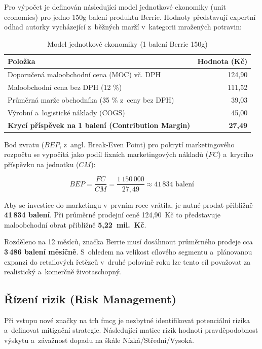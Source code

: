 Pro výpočet je definován následující model jednotkové ekonomiky (unit economics) pro jedno 150g balení produktu Berrie. Hodnoty představují expertní odhad autorky vycházející z~běžných marží v~kategorii mražených potravin:

\begin{table}[H]
\centering
\caption{Model jednotkové ekonomiky (1 balení Berrie 150g)}
\label{tab:unit_economics}
\begin{tabularx}{0.8\textwidth}{Xr}
\toprule
\textbf{Položka} & \textbf{Hodnota (Kč)} \\
\midrule
Doporučená maloobchodní cena (MOC) vč. DPH & 124,90 \\
Maloobchodní cena bez DPH (12 \%) & 111,52 \\
Průměrná marže obchodníka (35 \% z~ceny bez DPH) & 39,03 \\
Výrobní a~logistické náklady (COGS) & 45,00 \\
\midrule
\textbf{Krycí příspěvek na 1 balení (Contribution Margin)} & \textbf{27,49} \\
\bottomrule
\end{tabularx}
\end{table}

Bod zvratu ($BEP$, z~angl. Break-Even Point) pro pokrytí marketingového rozpočtu se vypočítá jako podíl fixních marketingových nákladů ($FC$) a~krycího příspěvku na jednotku ($CM$):

\begin{equation}
BEP = \frac{FC}{CM} = \frac{1\,150\,000}{27,49} \approx 41\,834 \text{ balení}
\end{equation}

Aby se investice do marketingu v~prvním roce vrátila, je nutné prodat přibližně \textbf{41\,834 balení}. Při průměrné prodejní ceně 124,90~Kč to představuje maloobchodní obrat přibližně \textbf{5,22~mil.~Kč}.

Rozděleno na 12 měsíců, značka Berrie musí dosáhnout průměrného prodeje cca \textbf{3\,486 balení měsíčně}. S~ohledem na velikost cílového segmentu a~plánovanou expanzi do retailových řetězců v~druhé polovině roku lze tento cíl považovat za realistický a~komerčně životaschopný.

\subsection{Řízení rizik (Risk Management)}
\label{subsec:res_risk_management}

Při vstupu nové značky na trh \gls{fmcg} je nezbytné identifikovat potenciální rizika a~definovat mitigační strategie. Následující matice rizik hodnotí pravděpodobnost výskytu a~závažnost dopadu na škále Nízká/Střední/Vysoká.

